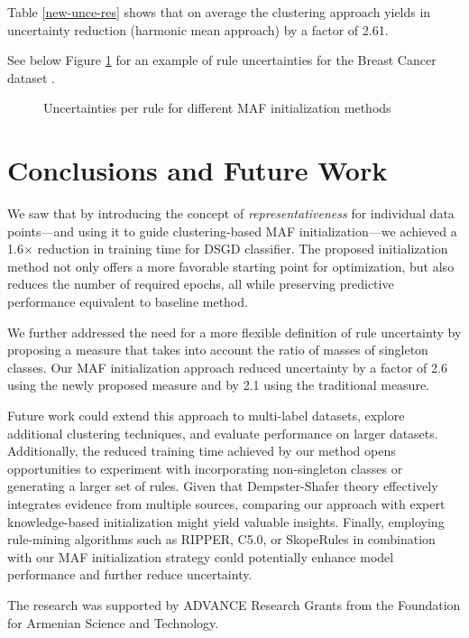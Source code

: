 \documentclass[10pt,a4paper,oneside]{article}
\begin{document}
Table \ref{new-unce-res} shows that on average the clustering approach yields in uncertainty reduction (harmonic mean approach) by a factor of 2.61.

{\color{black}
See below Figure \ref{fig:bars} for an example of rule uncertainties for the Breast Cancer dataset \cite{breastCancer}.
}
\begin{figure}[H]
    \caption{Uncertainties per rule for different MAF initialization methods}
    \label{fig:bars}
\end{figure}


\section{Conclusions and Future Work}\label{4}
We saw that by introducing the concept of \textit{representativeness} for individual data points—and using it to guide clustering-based MAF initialization—we achieved a 1.6× reduction in training time for DSGD classifier. The proposed initialization method not only offers a more favorable starting point for optimization{\color{black},} but also reduces the number of required epochs, all while preserving predictive performance equivalent to baseline method.

We further addressed the need for a more flexible definition of rule uncertainty by proposing a measure that takes into account the ratio of masses of singleton classes. Our MAF initialization approach reduced uncertainty by a factor of 2.6 using the newly proposed measure and by 2.1 using the traditional measure.

{\color{black}
Future work could extend this approach to multi-label datasets, explore additional clustering techniques, and evaluate performance on larger datasets. Additionally, the reduced training time achieved by our method opens opportunities to experiment with incorporating non-singleton classes or generating a larger set of rules. Given that Dempster-Shafer theory effectively integrates evidence from multiple sources, comparing our approach with expert knowledge-based {\color{black}initialization} might yield valuable insights. Finally, employing rule-mining algorithms such as RIPPER, C5.0, or SkopeRules \cite{ripper, c5, skoperules} in combination with our MAF initialization strategy could potentially enhance model performance and further reduce uncertainty.
}
\begin{Acknowledgements}
The research was supported by ADVANCE Research Grants from the Foundation for Armenian Science and Technology.
\end{Acknowledgements}
\end{document}
